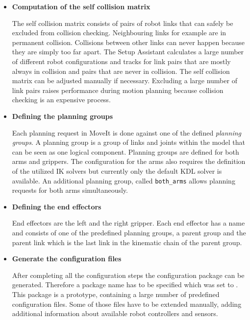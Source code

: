 \begin{itemize}

\item \textbf{Computation of the self collision matrix}

The self collision matrix consists of pairs of robot links that can safely be excluded from collision checking. Neighbouring links for example are in permanent collision. Collisions between other links can never happen because they are simply too far apart. The Setup Assistant calculates a large number of different robot configurations and tracks for link pairs that are mostly always in collision and pairs that are never in collision. The self collision matrix can be adjusted manually if necessary. Excluding a large number of link pairs raises performance during motion planning because collision checking is an expensive process.

\item \textbf{Defining the planning groups}

Each planning request in MoveIt is done against one of the defined \emph{planning groups}. A planning group is a group of links and joints within the model that can be seen as one logical component. Planning groups are defined for both arms and grippers. The configuration for the arms also requires the definition of the utilized IK solvers but currently only the default KDL solver is available. An additional planning group, called \texttt{both\_arms} allows planning requests for both arms simultaneously.

\item \textbf{Defining the end effectors}

End effectors are the left and the right gripper. Each end effector has a name and consists of one of the predefined planning groups, a parent group and the parent link which is the last link in the kinematic chain of the parent group.

\item \textbf{Generate the configuration files}

After completing all the configuration steps the configuration package can be generated. Therefore a package name has to be specified which was set to . This package is a prototype, containing a large number of predefined configuration files. Some of those files have to be extended manually, adding additional information about available robot controllers and sensors. 

\end{itemize}

